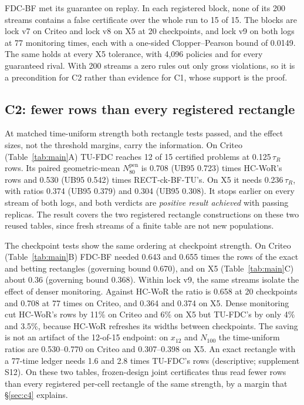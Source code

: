 \documentclass[sigconf,anonymous,review]{acmart}
\newcommand{\Npen}{N_{80}^{\text{pen}}}
\begin{document}
FDC-BF met its guarantee on replay. In each registered block, none of its 200 streams contains a false certificate over the whole run to 15 of 15. The blocks are lock v7 on Criteo and lock v8 on X5 at 20 checkpoints, and lock v9 on both logs at 77 monitoring times, each with a one-sided Clopper--Pearson bound of 0.0149. The same holds at every X5 tolerance, with 4,096 policies and for every guaranteed rival. With 200 streams a zero rules out only gross violations, so it is a precondition for C2 rather than evidence for C1, whose support is the proof.

\subsection{C2: fewer rows than every registered rectangle}\label{sec:c2}

At matched time-uniform strength both rectangle tests passed, and the effect sizes, not the threshold margins, carry the information. On Criteo (Table~\ref{tab:main}A) TU-FDC reaches 12 of 15 certified problems at 0.125\,$\tau_R$ rows. Its paired geometric-mean $\Npen$ is 0.708 (UB95 0.723) times HC-WoR's rows and 0.530 (UB95 0.542) times RECT-ck-BF-TU's. On X5 it needs 0.236\,$\tau_R$, with ratios 0.374 (UB95 0.379) and 0.304 (UB95 0.308). It stops earlier on every stream of both logs, and both verdicts are \emph{positive result achieved} with passing replicas. The result covers the two registered rectangle constructions on these two reused tables, since fresh streams of a finite table are not new populations.

The checkpoint tests show the same ordering at checkpoint strength. On Criteo (Table~\ref{tab:main}B) FDC-BF needed 0.643 and 0.655 times the rows of the exact and betting rectangles (governing bound 0.670), and on X5 (Table~\ref{tab:main}C) about 0.36 (governing bound 0.368). Within lock v9, the same streams isolate the effect of denser monitoring. Against HC-WoR the ratio is 0.658 at 20 checkpoints and 0.708 at 77 times on Criteo, and 0.364 and 0.374 on X5. Dense monitoring cut HC-WoR's rows by 11\% on Criteo and 6\% on X5 but TU-FDC's by only 4\% and 3.5\%, because HC-WoR refreshes its widths between checkpoints. The saving is not an artifact of the 12-of-15 endpoint: on $x_{12}$ and $N_{100}$ the time-uniform ratios are 0.530--0.770 on Criteo and 0.307--0.398 on X5. An exact rectangle with a 77-time ledger needs 1.6 and 2.8 times TU-FDC's rows (descriptive; supplement S12). On these two tables, frozen-design joint certificates thus read fewer rows than every registered per-cell rectangle of the same strength, by a margin that \S\ref{sec:c4} explains.
\end{document}
